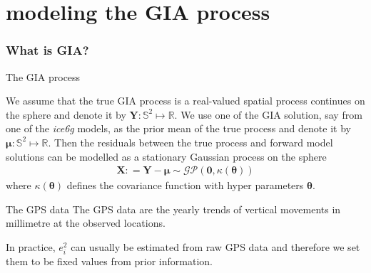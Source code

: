 \documentclass{beamer}
\begin{document}
\section{modeling the GIA process}
\begin{frame}
\frametitle{What is GIA?}

\end{frame}


\begin{frame}{The GIA process}

We assume that the true GIA process is a real-valued spatial process continues on the sphere and denote it by $\bm{Y}: \mathbb{S}^2 \mapsto \mathbb{R}$. We use one of the GIA solution, say from one of the \emph{ice6g} models, as the prior mean of the true process and denote it by $\bm{\mu}: \mathbb{S}^2 \mapsto \mathbb{R}$. Then the residuals between the true process and forward model solutions can be modelled as a stationary Gaussian process on the sphere 
\begin{align}\label{eq:GIAresid}
 \bm{X}: = \bm{Y} - \bm{\mu} \sim \mathcal{GP}(\bm{0}, \kappa(\bm{\theta}))
\end{align}
where $\kappa(\bm{\theta})$ defines the covariance function with hyper parameters $\bm{\theta}$.

\end{frame}

\begin{frame}{The GPS data}
The GPS  data are the yearly trends of vertical movements in millimetre at the observed locations. 

In practice, $e_i^2$ can usually be estimated from raw GPS data and therefore we set them to be fixed values from prior information. 
\end{frame}
\end{document}
